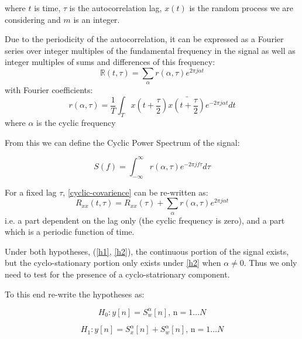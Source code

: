 \documentclass[conference]{IEEEtran}
\newcommand*\conjugate[1]{\bar{#1}}
\begin{document}
where \(t\) is time, \(\tau\) is the autocorrelation lag, \(x\left(t\right)\) is the random process we are considering and \(m\) is an integer. 

Due to the periodicity of the autocorrelation, it can be expressed as a Fourier series over integer multiples of the fundamental frequency in the signal as well as integer multiples of sums and differences of this frequency:
%
\begin{equation}
\mathbb{R}\left(t, \tau\right) = \sum_{\alpha} r\left(\alpha, \tau\right) e^{2\pi j \alpha t}  
\end{equation}
\label{cyclic-covarience}
%
with Fourier coefficients:
%
\begin{equation}
r\left(\alpha, \tau\right) = \frac{1}{T} \int_{T} x\left(t+\frac{\tau}{2}\right)\conjugate{x\left(t+\frac{\tau}{2}\right)} e^{-2\pi j \alpha t} dt
\end{equation}
%
where \(\alpha\) is the cyclic frequency

From this we can define the Cyclic Power Spectrum of the signal:

\begin{equation}
S\left(f\right) = \int_{-\infty}^{\infty} r\left(\alpha, \tau\right) e^{-2 \pi j f \tau} d\tau
\end{equation}

For a fixed lag \(\tau\), \ref{cyclic-covarience} can be re-written as:
%
\begin{equation}
R_{xx}\left(t, \tau \right) = R_{xx}\left(\tau\right) + \sum_{\alpha} r\left(\alpha, \tau\right) e^{2\pi j \alpha t}  
\end{equation}
%
i.e. a part dependent on the lag only (the cyclic frequency is zero), and a part which is a periodic function of time. 

Under both hypotheses, (\ref{h1}, \ref{h2}), the continuous portion of the signal exists, but the cyclo-stationary portion only exists under \ref{h2} when \(\alpha \neq 0\). Thus we only need to test for the presence of a cyclo-statrionary component. 

To this end re-write the hypotheses as:

\begin{equation}
H_{0}: y\left[n\right] = S_{w}^\alpha \left[n\right] \text{, n} =  1 \ldots N 
\end{equation}
\label{c1}

\begin{equation}
H_{1}: y\left[n \right] = S_{x}^{\alpha} \left[n\right] + S_{w}^{\alpha} \left[n\right] \text{, n} =  1 \ldots N 
\end{equation}
\label{c2}
\end{document}
